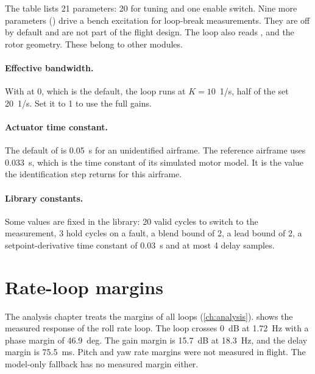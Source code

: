 The table lists 21 parameters: 20 for tuning and one enable switch.
Nine more parameters () drive a bench excitation for loop-break measurements.
They are off by default and are not part of the flight design.
The loop also reads ,  and the  rotor geometry.
These belong to other modules.

\paragraph{Effective bandwidth.}
With  at 0, which is the default, the loop runs at $K=10$~1/s, half of the set 20~1/s.
Set it to 1 to use the full gains.

\paragraph{Actuator time constant.}
The default of  is 0.05~s for an unidentified airframe.
The reference airframe uses 0.033~s, which is the time constant of its simulated motor model.
It is the value the identification step returns for this airframe.

\paragraph{Library constants.}
Some values are fixed in the library: 20 valid cycles to switch to the measurement, 3 hold cycles on a fault, a blend bound of 2, a lead bound of 2, a setpoint-derivative time constant of 0.03~s and at most 4 delay samples.

\section{Rate-loop margins}\label{sec:inner_margins}

The analysis chapter treats the margins of all loops (\cref{ch:analysis}).
 shows the measured response of the roll rate loop.
The loop crosses 0~dB at 1.72~Hz with a phase margin of 46.9~deg.
The gain margin is 15.7~dB at 18.3~Hz, and the delay margin is 75.5~ms.
Pitch and yaw rate margins were not measured in flight.
The model-only fallback has no measured margin either.

